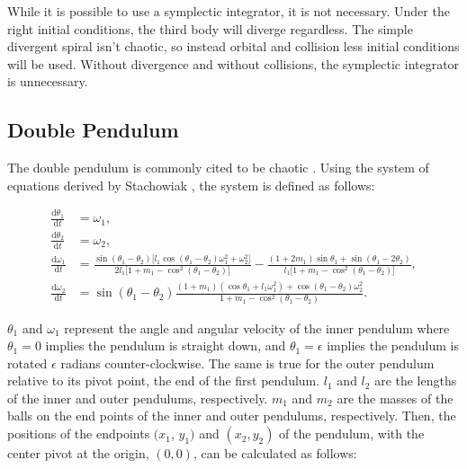 \documentclass{article}
\newcommand{\der}[2][t]{\frac{\mathrm{d}#2}{\mathrm{d}#1}}
\begin{document}
While it is possible to use a symplectic integrator, it is not necessary.
Under the right initial conditions, the third body will diverge regardless.
The simple divergent spiral isn't chaotic, so instead orbital and collision
less initial conditions will be used. Without divergence and without
collisions, the symplectic integrator is unnecessary.

\subsection{Double Pendulum}

The double pendulum is commonly cited to be chaotic
\cite{stachowiak2006numerical} \cite{levien1993double}. Using the system of
equations derived by Stachowiak \cite{stachowiak2006numerical}, the system is
defined as follows:

\begin{align}
    \der{\theta_1} &= \omega_1, \nonumber \\
    \der{\theta_2} &= \omega_2, \nonumber \\
    \der{\omega_1} &= 
    \frac{
        \sin(\theta_1 - \theta_2) \lbrack
            l_1 \cos(\theta_1 - \theta_2) \omega_1^2 + \omega_2^2
        \rbrack
    }{
        2 l_1 \lbrack
            1 + m_1 - \cos^2(\theta_1 - \theta_2)
        \rbrack
    }
    -
    \frac{
        (1 + 2 m_1) \sin \theta_1 + \sin(\theta_1 - 2 \theta_2)
    }{
        l_1 \lbrack
            1 + m_1 - \cos^2(\theta_1 - \theta_2)
        \rbrack
    }
    , \nonumber \\
    \der{\omega_2} &= \sin (\theta_1 - \theta_2) 
    \frac{
        (1+m_1) (\cos \theta_1 + l_1 \omega_1^2)
        +
        \cos(\theta_1 - \theta_2) \omega_2^2
    }{
        1 + m_1 - \cos^2(\theta_1 - \theta_2)
    }. \label{eq:doub_pen}
\end{align}

$\theta_1$ and $\omega_1$ represent the angle and angular velocity of the
inner pendulum where $\theta_1=0$ implies the pendulum is straight down, and
$\theta_1=\epsilon$ implies the pendulum is rotated $\epsilon$ radians
counter-clockwise. The same is true for the outer pendulum relative to its
pivot point, the end of the first pendulum. $l_1$ and $l_2$ are the lengths
of the inner and outer pendulums, respectively. $m_1$ and $m_2$ are the
masses of the balls on the end points of the inner and outer pendulums,
respectively. Then, the positions of the endpoints $(x_1$, $y_1)$ and $(x_2,
y_2)$ of the pendulum, with the center pivot at the origin, $(0, 0)$, can be
calculated as follows:
\end{document}
